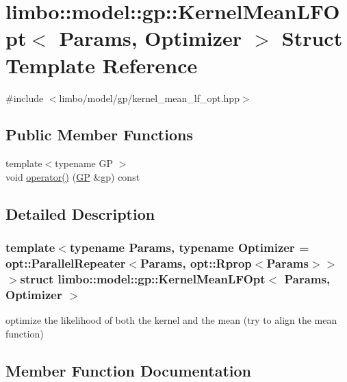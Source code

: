 \hypertarget{structlimbo_1_1model_1_1gp_1_1_kernel_mean_l_f_opt}{}\section{limbo\+:\+:model\+:\+:gp\+:\+:Kernel\+Mean\+L\+F\+Opt$<$ Params, Optimizer $>$ Struct Template Reference}
\label{structlimbo_1_1model_1_1gp_1_1_kernel_mean_l_f_opt}


{\ttfamily \#include $<$limbo/model/gp/kernel\+\_\+mean\+\_\+lf\+\_\+opt.\+hpp$>$}

\subsection*{Public Member Functions}
\begin{DoxyCompactItemize}
\item 
{\footnotesize template$<$typename G\+P $>$ }\\void \hyperlink{structlimbo_1_1model_1_1gp_1_1_kernel_mean_l_f_opt_a2fd0d46074879d180edd094a8cd02182}{operator()} (\hyperlink{classlimbo_1_1model_1_1_g_p}{G\+P} \&gp) const 
\end{DoxyCompactItemize}


\subsection{Detailed Description}
\subsubsection*{template$<$typename Params, typename Optimizer = opt\+::\+Parallel\+Repeater$<$\+Params, opt\+::\+Rprop$<$\+Params$>$$>$$>$struct limbo\+::model\+::gp\+::\+Kernel\+Mean\+L\+F\+Opt$<$ Params, Optimizer $>$}

optimize the likelihood of both the kernel and the mean (try to align the mean function) 

\subsection{Member Function Documentation}
\hypertarget{structlimbo_1_1model_1_1gp_1_1_kernel_mean_l_f_opt_a2fd0d46074879d180edd094a8cd02182}{}
